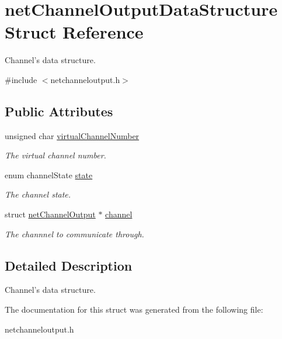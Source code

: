 \hypertarget{structnetChannelOutputDataStructure}{\section{net\-Channel\-Output\-Data\-Structure Struct Reference}
\label{structnetChannelOutputDataStructure}
}


Channel's data structure.  




{\ttfamily \#include $<$netchanneloutput.\-h$>$}

\subsection*{Public Attributes}
\begin{DoxyCompactItemize}
\item 
\hypertarget{structnetChannelOutputDataStructure_a7152a2aaa163b8efb752c36417e70378}{unsigned char \hyperlink{structnetChannelOutputDataStructure_a7152a2aaa163b8efb752c36417e70378}{virtual\-Channel\-Number}}\label{structnetChannelOutputDataStructure_a7152a2aaa163b8efb752c36417e70378}

\begin{DoxyCompactList}\small\item\em The virtual channel number. \end{DoxyCompactList}\item 
\hypertarget{structnetChannelOutputDataStructure_a88c5314d897197da81501eaad776bb39}{enum channel\-State \hyperlink{structnetChannelOutputDataStructure_a88c5314d897197da81501eaad776bb39}{state}}\label{structnetChannelOutputDataStructure_a88c5314d897197da81501eaad776bb39}

\begin{DoxyCompactList}\small\item\em The channel state. \end{DoxyCompactList}\item 
\hypertarget{structnetChannelOutputDataStructure_a3f40e388c701fbfcf254083306093dc8}{struct \hyperlink{structnetChannelOutput}{net\-Channel\-Output} $\ast$ \hyperlink{structnetChannelOutputDataStructure_a3f40e388c701fbfcf254083306093dc8}{channel}}\label{structnetChannelOutputDataStructure_a3f40e388c701fbfcf254083306093dc8}

\begin{DoxyCompactList}\small\item\em The channnel to communicate through. \end{DoxyCompactList}\end{DoxyCompactItemize}


\subsection{Detailed Description}
Channel's data structure. 

The documentation for this struct was generated from the following file\-:\begin{DoxyCompactItemize}
\item 
netchanneloutput.\-h\end{DoxyCompactItemize}

